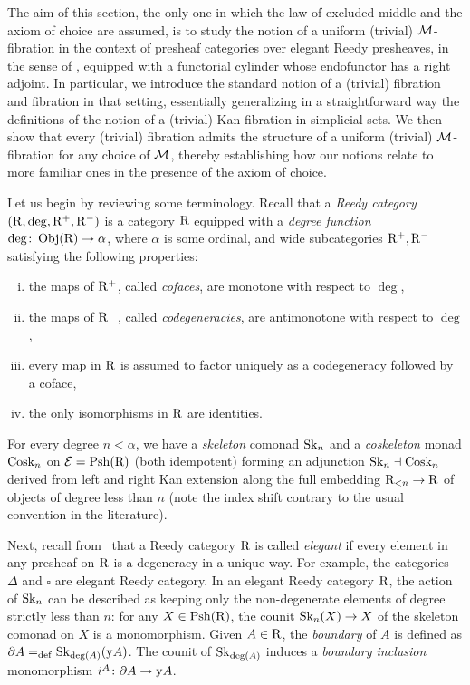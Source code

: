 \documentclass[reqno,10pt,a4paper,oneside,draft]{amsart}
\begin{document}
The aim of this section, the only one in which the law of excluded middle and the axiom of choice are assumed, is to study the notion of a uniform (trivial) $\cal{M}$-fibration in the context of presheaf categories over elegant Reedy presheaves, in the sense of \cite{bergner-rezk-elegant}, equipped with a functorial cylinder whose endofunctor has a right adjoint.
In particular, we introduce the standard notion of a (trivial) fibration and fibration in that setting, essentially generalizing in a straightforward way the definitions of the notion of a (trivial) Kan fibration in simplicial sets.
We then show that every (trivial) fibration admits the structure of a uniform (trivial) $\cal{M}$-fibration for any choice of $\cal{M}$, thereby establishing how our notions relate to more familiar ones in the presence of the axiom of choice.

Let us begin by reviewing some terminology.
Recall that a \emph{Reedy category} $(\R, \deg, \Rp, \Rm)$ is a category $\R$ equipped with a \emph{degree function} $\deg \co \obj(\R) \to \alpha$, where $\alpha$ is some ordinal, and wide subcategories $\Rp, \Rm$ satisfying the following properties:
\begin{enumerate}[(i)]
\item the maps of $\Rp$, called \emph{cofaces}, are monotone with respect to $\deg$,
\item the maps of $\Rm$, called \emph{codegeneracies}, are antimonotone with respect to $\deg$,
\item every map in $\R$ is assumed to factor uniquely as a codegeneracy followed by a coface,
\item the only isomorphisms in $\R$ are identities.
\end{enumerate}
For every degree $n < \alpha$, we have a \emph{skeleton} comonad $\Sk_n$ and a \emph{coskeleton} monad $\Cosk_n$ on $\catE = \Psh(\R)$ (both idempotent) forming an adjunction $\Sk_n \dashv \Cosk_n$ derived from left and right Kan extension along the full embedding $\R_{<n} \to \R$ of objects of degree less than $n$ (note the index shift contrary to the usual convention in the literature).

Next, recall from~\cite{bergner-rezk-elegant} that a Reedy category $\R$ is called \emph{elegant} if every element in any presheaf on $\R$ is a degeneracy in a unique way.
For example, the categories $\Delta$ and $\square$ are elegant Reedy category.
In an elegant Reedy category $\R$, the action of $\Sk_n$ can be described as keeping only the non-degenerate elements of degree strictly less than $n$: for any $X \in \Psh(\R)$, the counit $\Sk_n(X) \to X$ of the skeleton comonad on $X$ is a monomorphism.
Given $A \in \R$, the \emph{boundary} of $A$ is defined as $\partial A \defeq \Sk_{\deg(A)}(\yon A)$.
The counit of $\Sk_{\deg(A)}$ induces a \emph{boundary inclusion} monomorphism $i^A \co \partial A \to \yon A$.
\end{document}
